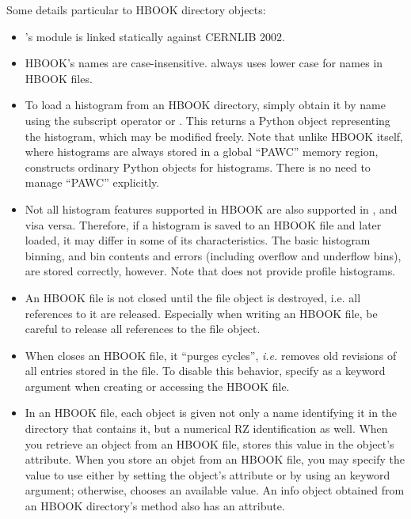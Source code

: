 Some details particular to HBOOK directory objects:
\begin{itemize}
 \item \pyhep's module  is linked statically
 against CERNLIB 2002.

 \item HBOOK's names are case-insensitive.  \pyhep always uses lower
 case for names in HBOOK files.

 \item To load a histogram from an HBOOK directory, simply obtain it by
 name using the subscript operator or .  This returns a
 Python object representing the histogram, which may be modified freely.
 Note that unlike HBOOK itself, where histograms are always stored in a
 global ``PAWC'' memory region, \pyhep constructs ordinary Python
 objects for histograms.  There is no need to manage ``PAWC''
 explicitly.

 \item Not all histogram features supported in HBOOK are also supported
 in \pyhep, and visa versa.  Therefore, if a histogram is saved to an
 HBOOK file and later loaded, it may differ in some of its
 characteristics.  The basic histogram binning, and bin contents and
 errors (including overflow and underflow bins), are stored correctly,
 however.  Note that \pyhep does not provide profile histograms.

 \item An HBOOK file is not closed until the file object is destroyed,
 i.e. all references to it are released.  Especially when writing an
 HBOOK file, be careful to release all references to the file object.

 \item When \pyhep closes an HBOOK file, it ``purges cycles'',
 \textit{i.e.} removes old revisions of all entries stored in the file.
 To disable this behavior, specify  as a
 keyword argument when creating or accessing the HBOOK file.

 \item In an HBOOK file, each object is given not only a name
 identifying it in the directory that contains it, but a numerical RZ
 identification as well.  When you retrieve an object from an HBOOK file,
 \pyhep stores this value in the object's  attribute.
 When you store an objet from an HBOOK file, you may specify the value
 to use either by setting the object's  attribute or by
 using an  keyword argument; otherwise, \pyhep chooses an
 available value.  An info object obtained from an HBOOK directory's
  method also has an  attribute.

\end{itemize}


